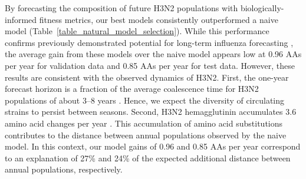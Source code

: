 By forecasting the composition of future H3N2 populations with biologically-informed fitness metrics, our best models consistently outperformed a naive model (Table~\ref{table_natural_model_selection}).
While this performance confirms previously demonstrated potential for long-term influenza forecasting \citep{Luksza:2014hj}, the average gain from these models over the naive model appears low at 0.96 AAs per year for validation data and 0.85 AAs per year for test data.
However, these results are consistent with the observed dynamics of H3N2.
First, the one-year forecast horizon is a fraction of the average coalescence time for H3N2 populations of about 3--8 years \citep{Rambaut:2008ew}.
Hence, we expect the diversity of circulating strains to persist between seasons.
Second, H3N2 hemagglutinin accumulates 3.6 amino acid changes per year \citep{Smith:2004jc}.
This accumulation of amino acid substitutions contributes to the distance between annual populations observed by the naive model.
In this context, our model gains of 0.96 and 0.85 AAs per year correspond to an explanation of 27\% and 24\% of the expected additional distance between annual populations, respectively.


